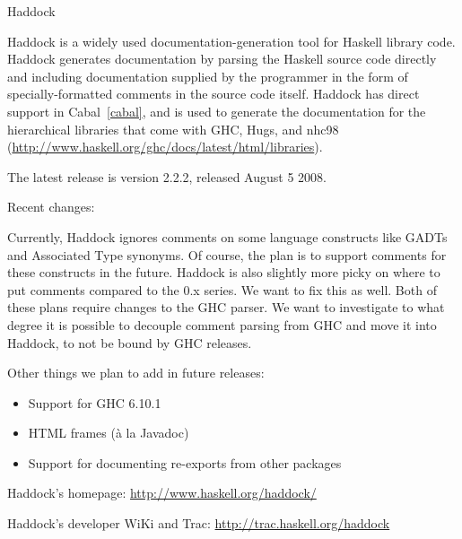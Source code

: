 \begin{hcarentry}[updated]{Haddock}
\label{haddock}
\makeheader

Haddock is a widely used documentation-generation tool for Haskell
library code.  Haddock generates documentation by parsing the Haskell
source code directly and including documentation supplied by the
programmer in the form of specially-formatted comments in the source
code itself.  Haddock has direct support in Cabal~\cref{cabal}, and is used to
generate the documentation for the hierarchical libraries that come
with GHC, Hugs, and nhc98
(\url{http://www.haskell.org/ghc/docs/latest/html/libraries}).

The latest release is version 2.2.2, released August 5 2008.

\Separate

Recent changes:


\FuturePlans
Currently, Haddock ignores comments on some language constructs like GADTs and
Associated Type synonyms. Of course, the plan is to support comments
for these constructs in the future.
Haddock is also slightly more picky on where to put comments compared
to the 0.x series. We want to fix this
as well. Both of these plans require changes to the GHC parser. We
want to investigate to what degree it is possible to
decouple comment parsing from GHC and move it into Haddock, to not be bound by
GHC releases.

Other things we plan to add in future releases:

\begin{itemize}
\item Support for GHC 6.10.1
\item HTML frames (à la Javadoc)
\item Support for documenting re-exports from other packages 
\end{itemize}

\FurtherReading
\begin{compactitem}
\item Haddock's homepage:
\url{http://www.haskell.org/haddock/}

\item Haddock's developer WiKi and Trac:
\url{http://trac.haskell.org/haddock}
\end{compactitem}
\end{hcarentry}
